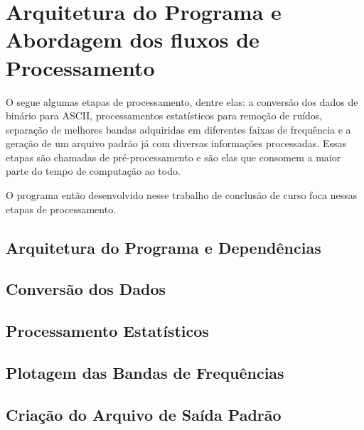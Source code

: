 \section{Arquitetura do Programa e Abordagem dos fluxos de Processamento}
\label{cap-algoritmos}
    
    O \MT segue algumas etapas de processamento, dentre elas: a conversão dos dados de binário para ASCII, processamentos estatísticos para remoção de ruídos, separação de melhores bandas adquiridas em diferentes faixas de frequência e a geração de um arquivo padrão já com diversas informações processadas. Essas etapas são chamadas de pré-processamento e são elas que consomem a maior parte do tempo de computação ao todo.
    
    O programa então desenvolvido nesse trabalho de conclusão de curso foca nessas etapas de processamento. %
    
    \subsection{Arquitetura do Programa e Dependências}
    \subsection{Conversão dos Dados}
    \subsection{Processamento Estatísticos}
    \subsection{Plotagem das Bandas de Frequências}
    \subsection{Criação do Arquivo de Saída Padrão}
    
    
    
    
    
    
